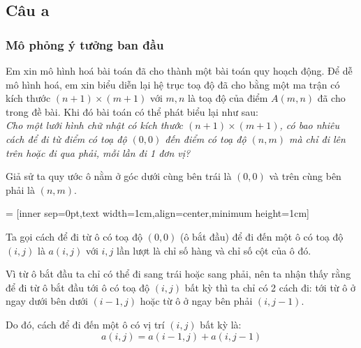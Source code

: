 \documentclass[12pt]{article}
\begin{document}
\subsection{Câu a}
\subsubsection{Mô phỏng ý tưởng ban đầu}
Em xin mô hình hoá bài toán đã cho thành một bài toán quy hoạch động. Để dễ mô hình hoá, em xin biểu diễn lại hệ trục toạ độ đã cho bằng một ma trận có kích thước $(n+1)\times (m+1)$ với $m, n$ là toạ độ của điểm $A(m,n)$ đã cho trong đề bài. Khi đó bài toán có thể phát biểu lại như sau:\\
\textit{Cho một lưới hình chữ nhật có kích thước $(n+1)\times(m+1)$, có bao nhiêu cách để đi từ điểm có toạ độ $(0, 0)$ đến điểm có toạ độ $(n, m)$ mà chỉ đi lên trên hoặc đi qua phải, mỗi lần đi 1 đơn vị?}\bigskip

Giả sử ta quy ước ô nằm ở góc dưới cùng bên trái là $(0,0)$ và trên cùng bên phải là $(n,m)$.\par

 = [inner sep=0pt,text width=1cm,align=center,minimum height=1cm]
\newcommand{\empt}{\hphantom{1pt}}

\begin{figure}
    \vspace*{-1cm}
\end{figure}

Ta gọi cách để đi từ ô có toạ độ $(0, 0)$ (ô bắt đầu) để đi đến một ô có toạ độ $(i,j)$ là $a(i, j)$ với $i, j$ lần lượt là chỉ số hàng và chỉ số cột của ô đó.

Vì từ ô bắt đầu ta chỉ có thể đi sang trái hoặc sang phải, nên ta nhận thấy rằng để đi từ ô bắt đầu tới ô có toạ độ $(i,j)$ bất kỳ thì ta chỉ có 2 cách đi: tới từ ô ở ngay dưới bên dưới $(i-1,j)$ hoặc từ ô ở ngay bên phải $(i,j-1)$. \par Do đó, cách để đi đến một ô có vị trí $(i, j)$ bất kỳ là:
$$
a(i, j) = a(i-1, j) + a(i, j-1)
$$
\end{document}
